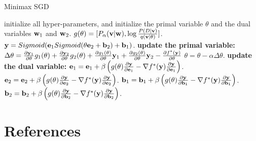 \documentclass{article}
\def\e{{\bf e}}
\def\b{{\bf b}}
\def\v{{\bf v}}
\def\y{{\bf y}}
\def\w{{\bf w}}
\begin{document}
\begin{algorithm}[!t]
    \caption{Minimax SGD}
    \label{algorithm_vrkm_plus_plus}
    \begin{algorithmic}[1]
        \State initialize all hyper-parameters, and initialize the primal variable $\theta$ and the dual variables $\w_1$ and $\w_2$.
        \State $g(\theta) = [P_{\alpha}(\v|\w), \log\frac{P(D|\v)}{q(\v|\theta)}]$.
        \State $\y=Sigmoid(\e_1 Sigmoid(\theta \e_2 + \b_2) + \b_1)$.
        \State \textbf{update the primal variable:} 
        \State $\Delta \theta = \frac{\partial \y_1 }{\partial \theta}g_1(\theta) + \frac{\partial \y_2 }{\partial \theta}g_2(\theta) + \frac{\partial g_1(\theta) }{\partial \theta} \y_1 + \frac{\partial g_2(\theta) }{\partial \theta} \y_2 -   \frac{\partial f^{\ast}(\y)}{\partial \theta}$
        \State $\theta = \theta - \alpha \Delta \theta$.
        \State \textbf{update the dual variable:} 
        \State $\e_1 = \e_1 + \beta \left (g(\theta)\frac{\partial \y}{\partial \e_1} - \nabla f^{\ast}(\y) \frac{\partial \y}{\partial \e_1} \right)$.
        \State $\e_2 = \e_2 + \beta \left (g(\theta)\frac{\partial \y}{\partial \e_2} - \nabla f^{\ast}(\y) \frac{\partial \y}{\partial \e_2} \right)$.
        \State $\b_1 = \b_1 + \beta \left ( g(\theta)\frac{\partial \y}{\partial \b_1} - \nabla f^{\ast}(\y) \frac{\partial \y}{\partial \b_1}\right)$.
        \State $\b_2 = \b_2 + \beta \left ( g(\theta)\frac{\partial \y}{\partial \b_2} - \nabla f^{\ast}(\y) \frac{\partial \y}{\partial \b_2}\right)$.
    \end{algorithmic}
\end{algorithm}







\section*{References}



\end{document}
